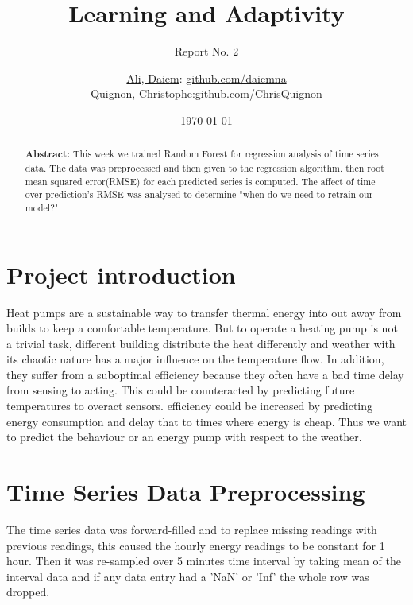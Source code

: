 \documentclass{scrartcl}
\begin{document}
\title{Learning and Adaptivity}
\subtitle{Report No. 2}
\author{
  \href{daiem.ali@smail.inf.h-brs.de}{Ali, Daiem}: \href{https://github.com/daiemna}{github.com/daiemna}\\
  \href{christophe.quignon@smail.inf.h-brs.de}{Quignon, Christophe}:\href{https://github.com/ChrisQuignon}{github.com/ChrisQuignon}
}
\date{\today}


\maketitle



\begin{abstract}
\textbf{Abstract:} This week we trained Random Forest for regression analysis of time series data. The data was preprocessed and then given to the regression algorithm, then root mean squared error(RMSE) for each predicted series is computed. The affect of time over prediction's RMSE was analysed to determine "when do we need to retrain our model?"
\end{abstract}


\section{Project introduction}
Heat pumps are a sustainable way to transfer thermal energy into out away from builds to keep a comfortable temperature. But to operate a heating pump is not a trivial task, different building distribute the heat differently and weather with its chaotic nature has a major influence on the temperature flow. In addition, they suffer from a suboptimal efficiency because they often have a bad time delay from sensing to acting. This could be counteracted by predicting future temperatures to overact sensors. efficiency could be increased by predicting energy consumption and delay that to times where energy is cheap. 
Thus we want to predict the behaviour or an energy pump with respect to the weather.


\section{Time Series Data Preprocessing}
%
The time series data was forward-filled and to replace missing readings with previous readings, this caused the hourly energy readings to be constant for 1 hour. Then it was re-sampled over 5 minutes time interval by taking mean of the interval data and if any data entry had a 'NaN' or 'Inf' the whole row was dropped. \par
\end{document}
